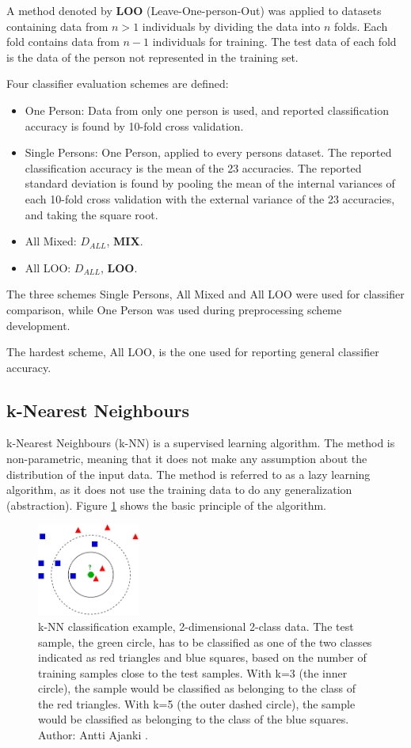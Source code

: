 A method denoted by \textbf{LOO} (Leave-One-person-Out) was applied to datasets
containing data from \(n>1\) individuals by dividing
the data into \(n\) folds. Each fold contains data from \(n-1\)
individuals for training. The test data of each fold is the
data of the person not represented in the training set.

Four classifier evaluation schemes are defined:
\begin{itemize}
\item One Person:
Data from only one person is used,
and reported classification accuracy is found by 10-fold cross validation.
\item Single Persons:
One Person, applied to every persons dataset. The reported
classification accuracy is the mean of the 23 accuracies.
The reported standard deviation is found by pooling
the mean of the internal variances of each 10-fold cross validation
with the external variance of the 23 accuracies,
and taking the square root.
\item All Mixed:
\(D_{ALL}\), \textbf{MIX}.
\item All LOO:
\(D_{ALL}\), \textbf{LOO}.
\end{itemize}
The three schemes Single Persons, All Mixed and All LOO
were used for classifier comparison,
while One Person was used during preprocessing
scheme development.

The hardest scheme, All LOO, is the one used for
reporting general classifier accuracy.

\subsection{k-Nearest Neighbours}
\label{sec:knn}
k-Nearest Neighbours (k-NN)
is a supervised learning algorithm.
The method is non-parametric,
meaning that it does not make any assumption about the distribution of the input data.
The method is referred to as a lazy learning algorithm,
as it does not use the training data to do any generalization (abstraction).
Figure \ref{fig:knn-example} \citep{knnwiki} shows the basic principle of the algorithm.
\begin{figure}[ht]
\centering
\includegraphics[width = 0.3\textwidth]{img/kNN-classification.png}
\caption[k-NN classification example]{
k-NN classification example, 2-dimensional 2-class data.
The test sample, the green circle,
has to be classified as one of the two classes indicated
as red triangles and blue squares, based on the number
of training samples close to the test samples.
With k=3 (the inner circle), the sample would be classified as belonging
to the class of the red triangles.
With k=5 (the outer dashed circle), the sample would be classified as belonging
to the class of the blue squares.
Author: Antti Ajanki \citep{knnwiki}.
}
\label{fig:knn-example}
\end{figure}

